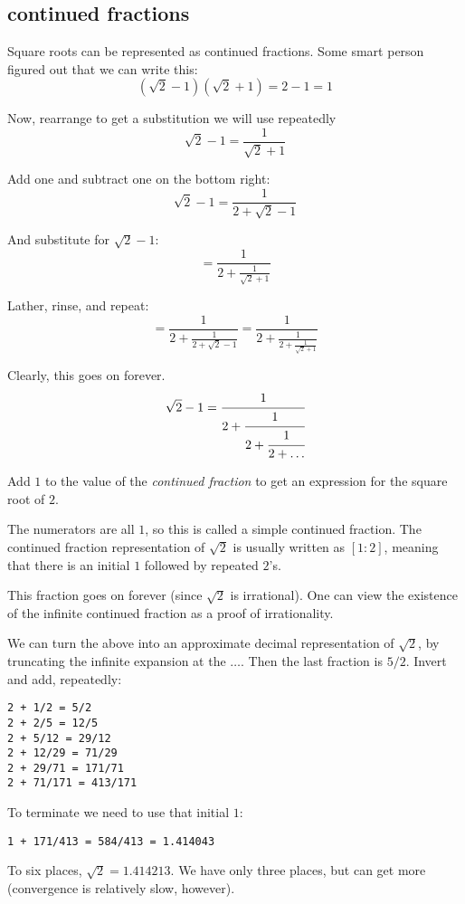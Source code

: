 \documentclass[11pt, oneside]{article}
\begin{document}
\subsection*{continued fractions}
Square roots can be represented as continued fractions.  Some smart person figured out that we can write this:
\[ (\sqrt{2} - 1)(\sqrt{2} + 1) = 2 - 1 = 1 \]

Now, rearrange to get a substitution we will use repeatedly
\[ \sqrt{2} - 1 = \frac{1}{\sqrt{2} + 1} \]

Add one and subtract one on the bottom right:
\[ \sqrt{2} - 1 =  \frac{1}{2 + \sqrt{2} - 1} \]

And substitute for $\sqrt{2} - 1$:
\[ = \frac{1}{2 + \frac{1}{\sqrt{2} + 1}} \]

Lather, rinse, and repeat:
\[ = \frac{1}{2 + \frac{1}{2 + \sqrt{2} - 1}} = \frac{1}{2 + \frac{1}{2 + \frac{1}{\sqrt{2} + 1} }} \]

Clearly, this goes on forever.
\[ \sqrt{2} - 1 =  \cfrac{1}{2+\cfrac{1}{2+\cfrac{1}{2 + \dots}}}  \]

Add $1$ to the value of the \emph{continued fraction} to get an expression for the square root of $2$.

The numerators are all $1$, so this is called a simple continued fraction.  The continued fraction representation of $\sqrt{2}$ is usually written as $[1:2]$, meaning that there is an initial $1$ followed by repeated $2$'s.

This fraction goes on forever (since $\sqrt{2}$ is irrational).  One can view the existence of the infinite continued fraction as a proof of irrationality.

We can turn the above into an approximate decimal representation of $\sqrt{2}$, by truncating the infinite expansion at the $\dots$.  Then the last fraction is $5/2$.  Invert and add, repeatedly:

\begin{verbatim}
2 + 1/2 = 5/2
2 + 2/5 = 12/5
2 + 5/12 = 29/12
2 + 12/29 = 71/29
2 + 29/71 = 171/71
2 + 71/171 = 413/171
\end{verbatim}

To terminate we need to use that initial $1$:
\begin{verbatim}
1 + 171/413 = 584/413 = 1.414043
\end{verbatim}

To six places, $\sqrt{2} = 1.414213$.  We have only three places, but can get more (convergence is relatively slow, however).
\end{document}
